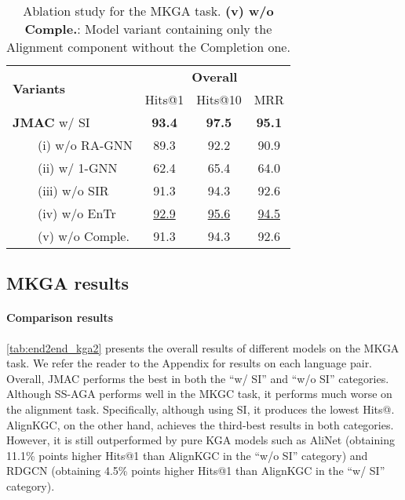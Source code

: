 \documentclass[11pt]{article}
\begin{document}
\begin{table}[!t]
    \begin{adjustbox}{width=210pt,center}
    \centering
    \setlength{\tabcolsep}{0.4em}
    \def\arraystretch{1.1}
    \begin{tabular}{l|c|c|c}
    \hline
    \multirow{2}{*}{\bf Variants} & 
    \multicolumn{3}{c}{\bf Overall} \\
    \cline{2-4}
    & Hits@1 & Hits@10 & MRR \\
    \hline
\textbf{JMAC} w/ SI & \bf 93.4 & \bf 97.5 & \bf 95.1 \\
    \hline
    \ \ \ \ (i) w/o RA-GNN & 89.3 & 92.2 & 90.9 \\
    \ \ \ \ (ii) w/ 1-GNN & 62.4 & 65.4 & 64.0\\
    \ \ \ \ (iii) w/o SIR & 91.3 & 94.3 & 92.6 \\
    \ \ \ \ (iv) w/o EnTr & \underline{92.9} & \underline{95.6} & \underline{94.5} \\
    \ \ \ \ (v) w/o Comple. & 91.3 & 94.3 & 92.6 \\
    \hline
\end{tabular}
    \end{adjustbox}
    \caption{Ablation study for the MKGA task. \textbf{(v) w/o Comple.}: Model variant containing only the Alignment component without the Completion one. }
    \label{tab:ablation_kga_new}
\end{table}



\subsection{MKGA results}\label{ssec:mkgaresults}



\paragraph{Comparison results} \autoref{tab:end2end_kga2} presents the overall results of different models on the MKGA task. We refer the reader to the Appendix for results on each language pair. 
Overall, JMAC performs the best in both the ``w/ SI'' and ``w/o SI'' categories. Although SS-AGA performs well in the MKGC task, it performs much worse on the alignment task. Specifically, although using SI, it produces the lowest Hits@. {AlignKGC}, on the other hand, achieves the third-best results in both categories. However, it is still outperformed by pure KGA models such as {AliNet} (obtaining 11.1\% points higher Hits@1 than AlignKGC in the ``w/o SI'' category) and {RDGCN} (obtaining 4.5\% points higher Hits@1 than AlignKGC in the ``w/ SI'' category). 
\end{document}
